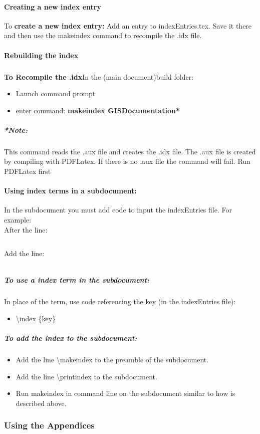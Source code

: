 \documentclass[class=book , crop=false]{standalone}
\begin{document}
\paragraph{Creating a new index entry}
To \textbf{create a new index entry:} Add an entry to indexEntries.tex.  Save it there and then use the makeindex command to recompile the .idx file.

\paragraph{Rebuilding the index}
\subparagraph{}\textbf{To Recompile the .idx}In the (main document)build folder:
\begin{itemize}
\item Launch command prompt
\item enter command: \textbf{{\large makeindex GISDocumentation*}}
\end{itemize}
\subparagraph{*Note:} {\footnotesize This command reads the .aux file and creates the .idx file.  The .aux file is created by compiling with PDFLatex.  If there is no .aux file the command will fail. Run PDFLatex first}

\paragraph{Using index terms in a subdocument:}
In the subdocument you must add code to input the indexEntries file.  For example:\\
After the line:
\begin{verbatim}

\end{verbatim}
Add the line:
\begin{verbatim}

\end{verbatim}

\subparagraph{To use a index term in the subdocument:\texorpdfstring{\\}{}}
In place of the term, use code referencing the key (in the indexEntries file):

\begin{itemize}
\item \textbackslash index \{key\}
\end{itemize} 

\subparagraph{To add the index to the subdocument:}
\begin{itemize}
\item Add the line \textbackslash makeindex to the preamble of the subdocument.
\item Add the line \textbackslash printindex to the subdocument.
\item Run makeindex in command line on the subdocument similar to how is described above.

\end{itemize}


\subsubsection[Using the Appendices]{{\Large Using the Appendices}}
\end{document}
